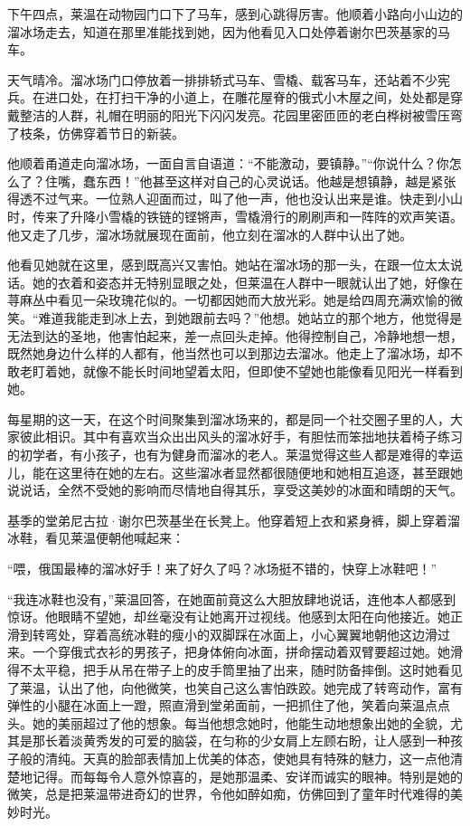 \par 下午四点，莱温在动物园门口下了马车，感到心跳得厉害。他顺着小路向小山边的溜冰场走去，知道在那里准能找到她，因为他看见入口处停着谢尔巴茨基家的马车。
\par 天气晴冷。溜冰场门口停放着一排排轿式马车、雪橇、载客马车，还站着不少宪兵。在进口处，在打扫干净的小道上，在雕花屋脊的俄式小木屋之间，处处都是穿戴整洁的人群，礼帽在明丽的阳光下闪闪发亮。花园里密匝匝的老白桦树被雪压弯了枝条，仿佛穿着节日的新装。
\par 他顺着甬道走向溜冰场，一面自言自语道：“不能激动，要镇静。”“你说什么？你怎么了？住嘴，蠢东西！”他甚至这样对自己的心灵说话。他越是想镇静，越是紧张得透不过气来。一位熟人迎面而过，叫了他一声，他也没认出来是谁。快走到小山时，传来了升降小雪橇的铁链的铿锵声，雪橇滑行的刷刷声和一阵阵的欢声笑语。他又走了几步，溜冰场就展现在面前，他立刻在溜冰的人群中认出了她。
\par 他看见她就在这里，感到既高兴又害怕。她站在溜冰场的那一头，在跟一位太太说话。她的衣着和姿态并无特别显眼之处，但莱温在人群中一眼就认出了她，好像在荨麻丛中看见一朵玫瑰花似的。一切都因她而大放光彩。她是给四周充满欢愉的微笑。“难道我能走到冰上去，到她跟前去吗？”他想。她站立的那个地方，他觉得是无法到达的圣地，他害怕起来，差一点回头走掉。他得控制自己，冷静地想一想，既然她身边什么样的人都有，他当然也可以到那边去溜冰。他走上了溜冰场，却不敢老盯着她，就像不能长时间地望着太阳，但即使不望她也能像看见阳光一样看到她。
\par 每星期的这一天，在这个时间聚集到溜冰场来的，都是同一个社交圈子里的人，大家彼此相识。其中有喜欢当众出出风头的溜冰好手，有胆怯而笨拙地扶着椅子练习的初学者，有小孩子，也有为健身而溜冰的老人。莱温觉得这些人都是难得的幸运儿，能在这里待在她的左右。这些溜冰者显然都很随便地和她相互追逐，甚至跟她说说话，全然不受她的影响而尽情地自得其乐，享受这美妙的冰面和晴朗的天气。
\par 基季的堂弟尼古拉·谢尔巴茨基坐在长凳上。他穿着短上衣和紧身裤，脚上穿着溜冰鞋，看见莱温便朝他喊起来：
\par “喂，俄国最棒的溜冰好手！来了好久了吗？冰场挺不错的，快穿上冰鞋吧！”
\par “我连冰鞋也没有，”莱温回答，在她面前竟这么大胆放肆地说话，连他本人都感到惊讶。他眼睛不望她，却丝毫没有让她离开过视线。他感到太阳在向他接近。她正滑到转弯处，穿着高统冰鞋的瘦小的双脚踩在冰面上，小心翼翼地朝他这边滑过来。一个穿俄式衣衫的男孩子，把身体俯向冰面，拼命摆动着双臂要超过她。她滑得不太平稳，把手从吊在带子上的皮手筒里抽了出来，随时防备摔倒。这时她看见了莱温，认出了他，向他微笑，也笑自己这么害怕跌跤。她完成了转弯动作，富有弹性的小腿在冰面上一蹬，照直滑到堂弟面前，一把抓住了他，笑着向莱温点点头。她的美丽超过了他的想象。每当他想念她时，他能生动地想象出她的全貌，尤其是那长着淡黄秀发的可爱的脑袋，在匀称的少女肩上左顾右盼，让人感到一种孩子般的清纯。天真的脸部表情加上优美的体态，使她具有特殊的魅力，这一点他清楚地记得。而每每令人意外惊喜的，是她那温柔、安详而诚实的眼神。特别是她的微笑，总是把莱温带进奇幻的世界，令他如醉如痴，仿佛回到了童年时代难得的美妙时光。
